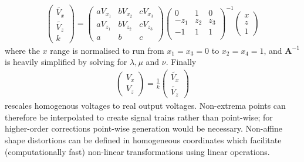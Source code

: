 \begin{align}
\begin{pmatrix}
\widetilde{V_x}  \\
\widetilde{V_z} \\
k
\end{pmatrix}=\begin{pmatrix}
 aV_{x_1} &  bV_{x_2} &  cV_{x_3} \\
 aV_{z_1} &  bV_{z_2} &  cV_{z_3} \\
 a & b  & c
\end{pmatrix}
\begin{pmatrix}
    0 & 1 & 0 \\
    -z_1 & z_2 & z_3 \\
    -1 & 1 & 1 \\
  \end{pmatrix}^{-1}
\begin{pmatrix}
x  \\
z \\
1
\end{pmatrix}
\end{align}
where the $x$ range is normalised to run from $x_1 = x_3 = 0$ to $x_2 =x_4=1$, and $\textbf{A}^{-1}$ is heavily simplified by solving for $ \lambda, \mu$ and $\nu$. Finally
\begin{align}
\begin{pmatrix}
V_x  \\
V_z
\end{pmatrix} =
\frac{1}{k}
\begin{pmatrix}
\widetilde{V_x}  \\
\widetilde{V_z}
\end{pmatrix}
\end{align}
rescales homogenous voltages to real output voltages.
Non-extrema points can therefore be interpolated to create signal trains rather than point-wise; for higher-order corrections point-wise generation would be necessary.
\if
Non-affine shape distortions can be defined in homogeneous coordinates which facilitate (computationally fast) %
non-linear transformations using linear operations.
